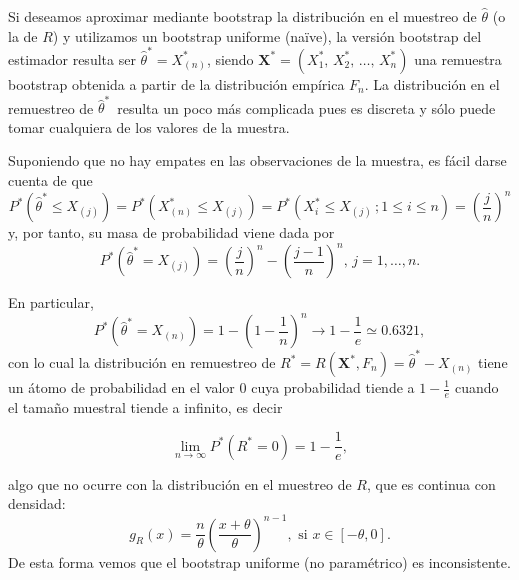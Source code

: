 \documentclass[
  spanish,
  10pt,
]{book}
\renewcommand{\mathbf}[1]{\symbf{#1}}
\theoremstyle{break}
\theoremstyle{nonumberplain}
\begin{document}
Si deseamos aproximar mediante bootstrap la distribución en el muestreo de \(\hat{\theta}\) (o la de \(R\)) y utilizamos un bootstrap uniforme (naïve), la versión bootstrap del estimador resulta ser \(\hat{\theta}^{\ast}=X_{(n)}^{\ast}\),
siendo \(\mathbf{X}^{\ast}=\left(X_1^{\ast}\text{, }X_2^{\ast}\text{, }\ldots \text{, }X_n^{\ast} \right)\) una remuestra bootstrap obtenida a partir de la distribución empírica \(F_n\).
La distribución en el remuestreo de \(\hat{\theta} ^{\ast}\,\) resulta un poco más complicada pues es discreta y sólo puede
tomar cualquiera de los valores de la muestra.

Suponiendo que no hay empates en las observaciones de la muestra, es fácil darse cuenta de que
\[P^{\ast}\left( \hat{\theta}^{\ast}\leq X_{(j)} \right)
=P^{\ast}\left( X_{(n)}^{\ast}\leq X_{(j)
} \right) =P^{\ast}\left( X_i^{\ast}\leq X_{(j)}\,;
 1 \leq i \leq n \right) =\left( \frac{j}{n} \right)^{n}\]
y, por tanto, su masa de probabilidad viene dada por
\[P^{\ast}\left( \hat{\theta}^{\ast}=X_{(j)} \right) =\left( 
\frac{j}{n} \right)^{n}-\left( \frac{j-1}{n} \right)^{n}\text{, }j=1,\ldots,n.\]

En particular,
\[P^{\ast}\left( \hat{\theta}^{\ast}=X_{(n)} \right) =1-\left( 1-
\frac{1}{n} \right)^{n}\rightarrow 1-\frac{1}{e}\simeq 0.6321,\]
con lo cual la distribución en remuestreo de \(R^{\ast}=R\left(
\mathbf{X}^{\ast},F_n \right) =\hat{\theta}^{\ast}-X_{\left(
n \right)}\) tiene un átomo de probabilidad en el valor \(0\) cuya
probabilidad tiende a \(1-\frac{1}{e}\) cuando el tamaño muestral tiende a infinito, es decir

\[\lim_{n\rightarrow \infty }P^{\ast}\left( R^{\ast}=0 \right) =1-\frac{1}{e},\]

algo que no ocurre con la distribución en el muestreo de \(R\), que es continua con densidad:
\[g_R\left( x \right) =\frac{n}{\theta }\left( \frac{x + \theta}{\theta } \right)^{n-1},
\text{ si }x\in \left[ -\theta, 0\right].\]
De esta forma vemos que el bootstrap uniforme (no paramétrico) es inconsistente.
\end{document}
